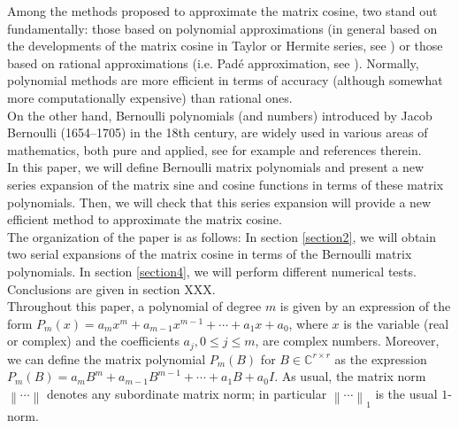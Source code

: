 Among the methods proposed to approximate the matrix cosine, two stand out fundamentally: those based on polynomial approximations (in general based on the
developments of the matrix cosine in Taylor or Hermite series, see \cite{sastre2017two, sastre2019fast, defez2019efficient}) or those based on rational
approximations (i.e. Pad\'e approximation, see \cite{tsitouras2014bounds, Serb79, Serb80, AlHR15}). Normally, polynomial methods are more efficient
in terms of accuracy (although somewhat more computationally expensive) than rational ones.\\

On the other hand, Bernoulli polynomials (and numbers) introduced by Jacob Bernoulli  (1654--1705) in the 18th century, are widely used in various areas of mathematics, both pure and applied, see for example \cite{kouba2013lecture} and references therein.\\

In this paper, we will define Bernoulli matrix polynomials and present a new series expansion of the matrix sine and cosine functions in terms
of these matrix polynomials. Then, we will check that this series expansion will provide a new efficient method to approximate the
matrix cosine.\\

The organization of the paper is as follows: In section \ref{section2}, we will obtain two serial expansions of the matrix cosine in terms of the Bernoulli
matrix polynomials. In section \ref{section4}, we will perform different numerical tests. Conclusions are given in section XXX.\\

Throughout this paper, a polynomial of degree $m$ is given by an expression of the form $P_m(x)=a_{m} x^m+a_{m-1}x^{m-1}+\cdots+a_{1}x+a_{0}$, where $x$ is
the variable (real or complex) and the coefficients $a_j, 0\leq j \leq m$, are complex numbers. Moreover, we can define the matrix polynomial $P_m(B)$ for
$B \in \mathbb{C}^{r \times r}$  as the expression $P_m(B)=a_{m} B^m+a_{m-1}B^{m-1}+\cdots+a_{1}B+a_{0}I$.  As usual, the matrix norm $\left\|\cdots \right\|$
denotes any subordinate matrix norm; in particular $\left\| \cdots \right\|_{1}$ is the usual $1$-norm.

